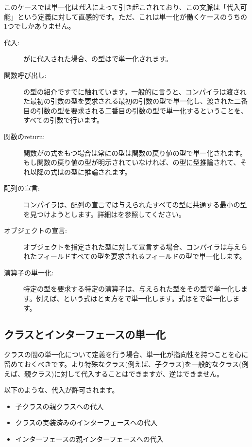このケースでは単一化は\emph{代入}によって引き起こされており、この文脈は「代入可能」という定義に対して直感的です。ただ、これは単一化が働くケースのうちの1つでしかありません。

\begin{description}
	\item[代入:] がに代入された場合、の型はで単一化されます。
	\item[関数呼び出し:] の型の紹介ですでに触れています。一般的に言うと、コンパイラは渡された最初の引数の型を要求される最初の引数の型で単一化し、渡された二番目の引数の型を要求される二番目の引数の型で単一化するということを、すべての引数で行います。
	\item[関数のreturn:] 関数がの式をもつ場合は常にの型は関数の戻り値の型で単一化されます。もし関数の戻り値の型が明示されていなければ、の型に型推論されて、それ以降の式はの型に推論されます。
	\item[配列の宣言:] コンパイラは、配列の宣言では与えられたすべての型に共通する最小の型を見つけようとします。詳細はを参照してください。
	\item[オブジェクトの宣言:] オブジェクトを指定された型に対して宣言する場合、コンパイラは与えられたフィールドすべての型を要求されるフィールドの型で単一化します。
	\item[演算子の単一化:] 特定の型を要求する特定の演算子は、与えられた型をその型で単一化します。例えば、という式はと両方をで単一化します。式はをで単一化します。
\end{description}


\subsection{クラスとインターフェースの単一化}
\label{type-system-unification-between-classes-and-interfaces}

クラスの間の単一化について定義を行う場合、単一化が指向性を持つことを心に留めておくべきです。より特殊なクラス(例えば、子クラス)を一般的なクラス(例えば、親クラス)に対して代入することはできますが、逆はできません。

以下のような、代入が許可されます。

\begin{itemize}
	\item 子クラスの親クラスへの代入
	\item クラスの実装済みのインターフェースへの代入
	\item インターフェースの親インターフェースへの代入
\end{itemize}

